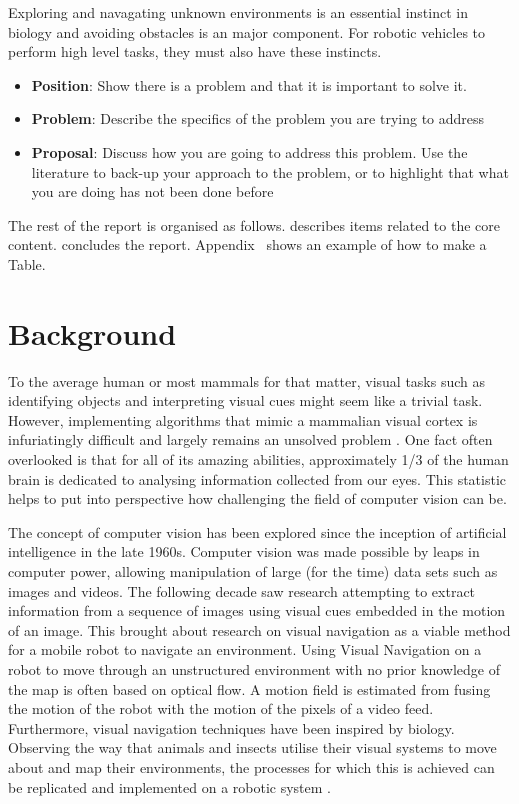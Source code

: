\documentclass{UoNMCHA}
\numberwithin{equation}{section}
\begin{document}
Exploring and navagating unknown environments is an essential instinct in biology and avoiding obstacles is an major component. For robotic vehicles to perform high level tasks, they must also have these instincts.

\begin{itemize}
    \item \textbf{Position}: Show there is a problem and that it is important to solve it.
    \item \textbf{Problem}: Describe the specifics of the problem you are trying to address
    \item \textbf{Proposal}: Discuss how you are going to address this problem. Use the literature to back-up your approach to the problem, or to highlight that what you are doing has not been done before
\end{itemize}

The rest of the report is organised as follows.  describes items related to the core content.  concludes the report. Appendix~ shows an example of how to make a Table.

\newpage
\section{Background}\label{sec:Background} %
To the average human or most mammals for that matter, visual tasks such as identifying objects and interpreting visual cues might seem like a trivial task. However, implementing algorithms that mimic a mammalian visual cortex is infuriatingly difficult and largely remains an unsolved problem \citep{hartley2003multiple}. One fact often overlooked is that for all of its amazing abilities, approximately 1/3 of the human brain is dedicated to analysing information collected from our eyes. This statistic helps to put into perspective how challenging the field of computer vision can be.

The concept of computer vision has been explored since the inception of artificial intelligence in the late 1960s. Computer vision was made possible by leaps in computer power, allowing manipulation of large (for the time) data sets such as images and videos. The following decade saw research attempting to extract information from a sequence of images using visual cues embedded in the motion of an image. This brought about research on visual navigation as a viable method for a mobile robot to navigate an environment. Using Visual Navigation on a robot to move through an unstructured environment with no prior knowledge of the map is often based on optical flow. A motion field is estimated from fusing the motion of the robot with the motion of the pixels of a video feed. Furthermore, visual navigation techniques have been inspired by biology. Observing the way that animals and insects utilise their visual systems to move about and map their environments, the processes for which this is achieved can be replicated and implemented on a robotic system \citep{altshuler2018comparison}.
\end{document}

